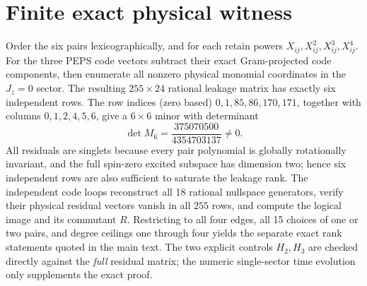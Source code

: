 \documentclass[aps,pra,twocolumn,nofootinbib,superscriptaddress,10pt]{revtex4-2}
\begin{document}
\section{Finite exact physical witness}\label{app:cert}
Order the six pairs lexicographically, and for each retain powers $X_{ij},X_{ij}^2,X_{ij}^3,X_{ij}^4$. For the three PEPS code vectors subtract their exact Gram-projected code components, then enumerate all nonzero physical monomial coordinates in the $J_z=0$ sector. The resulting $255\times24$ rational leakage matrix has exactly six independent rows. The row indices (zero based) $0,1,85,86,170,171$, together with columns $0,1,2,4,5,6$, give a $6\times6$ minor with determinant
\begin{equation}\label{eq:minor}
\boxed{\det M_6=\frac{375070500}{4354703137}\ne0.}
\end{equation}
All residuals are singlets because every pair polynomial is globally rotationally invariant, and the full spin-zero excited subspace has dimension two; hence six independent rows are also sufficient to saturate the leakage rank. The independent code loops reconstruct all 18 rational nullspace generators, verify their physical residual vectors vanish in all $255$ rows, and compute the logical image and its commutant $R$. Restricting to all four edges, all 15 choices of one or two pairs, and degree ceilings one through four yields the separate exact rank statements quoted in the main text. The two explicit controls $H_2,H_3$ are checked directly against the \emph{full} residual matrix; the numeric single-sector time evolution only supplements the exact proof.
\end{document}

